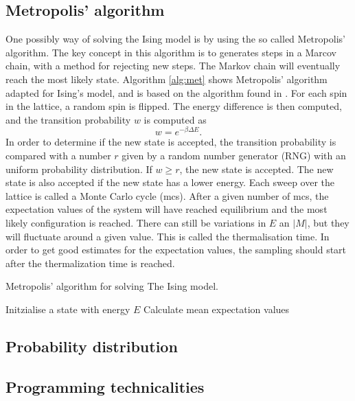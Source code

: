 \subsection{Metropolis' algorithm}
One possibly way of solving the Ising model is by using the so called Metropolis' algorithm. The key concept in this algorithm is to generates steps in a Marcov chain, with a method for rejecting new steps. The Markov chain will eventually reach the most likely state. Algorithm \ref{alg:met} shows Metropolis' algorithm adapted for Ising's model, and is based on the algorithm found in \cite{lecturenotes}. For each spin in the lattice, a random spin is flipped. The energy difference is then computed, and the transition probability $w$ is computed as
\begin{equation}
w=e^{- \beta \Delta E }.
\end{equation}
In order to determine if the new state is accepted, the transition probability
is compared with a number $r$ given by a random number generator (RNG) with an uniform probability distribution. If $w \geq r$, the new state is accepted. The new state is also accepted if the new state has a lower energy. Each sweep over the lattice is called a Monte Carlo cycle (mcs). After a given number of mcs, the expectation values of the system will have reached equilibrium and the most likely configuration is reached. There can still be variations in $E$ an $|M|$, but they will fluctuate around a given value. This is called the thermalisation time. In order to get good estimates for the expectation values, the sampling should start after the thermalization time is reached. 


\begin{algorithm}[htbp]\label{alg:met}\caption{Metropolis' algorithm for solving The Ising model.}
	\SetAlgoLined
	\BlankLine
	\BlankLine
	Initzialise a state with energy $E$\;
	Calculate mean expectation values\;	
	\BlankLine
	\BlankLine
\end{algorithm}

\subsection{Probability distribution}

\subsection{Programming technicalities}
